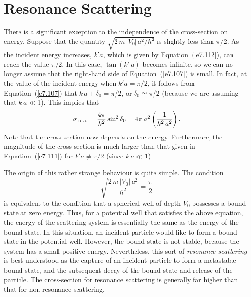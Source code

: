 \section{Resonance Scattering}
There is a significant exception to the independence of the cross-section on energy. Suppose that the quantity $\sqrt{2\,m \,|V_0|\,a^2/\hbar^2}$
is slightly less than $\pi/2$. As the incident energy increases, $k'a$,
which is given by Equation~(\ref{e7.112}), can reach the value $\pi/2$. In this case,
$\tan( k'\,a)$ becomes infinite, so we can no longer assume that the right-hand side of Equation~(\ref{e7.107}) is small. In fact,
at the value of the incident energy
when $k'a = \pi/2$, it follows from Equation~(\ref{e7.107}) that $k\,a+\delta_0 = \pi/2$,
or $\delta_0 \simeq \pi/2$ (because we are assuming that $k\,a\ll 1$). 
This implies that
\begin{equation}
\sigma_{\rm total} = \frac{4\pi}{k^2} \sin^2\delta_0 = 4\pi \,a^2
\left(\frac{1}{k^2 \,a^2}\right).
\end{equation}
Note that the cross-section now depends on the energy. Furthermore, the
magnitude of the cross-section is much larger than that given in Equation~(\ref{e7.111})
for $k'a\neq \pi/2$ (since $k\,a\ll 1$). 

The origin of this rather strange behaviour is quite simple. The condition
\begin{equation}
\sqrt{\frac{2\,m\,|V_0 |\,a^2}{\hbar^2} } = \frac{\pi}{2}
\end{equation}
is equivalent to the condition that a spherical well of depth
$V_0$ possesses a bound state at zero energy. Thus, for a potential
well that satisfies the above equation, the energy of the scattering system
is essentially the same as the energy of the bound state. In this situation,
an incident particle would like to form a bound state in the potential
well. However, the bound state is not stable, because  the system has a small
positive energy. Nevertheless, this sort of {\em resonance scattering}\/
is best understood as the capture of an incident particle to form
a metastable bound state, and the subsequent decay of the bound state
and release of the particle. The cross-section for resonance scattering
is generally far higher than that for non-resonance scattering.

